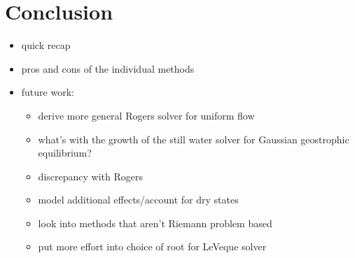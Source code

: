 \chapter{Conclusion}
\label{ch:conclusion}

\begin{itemize}
  \item quick recap
  \item pros and cons of the individual methods
  \item future work:
  \begin{itemize}
    \item derive more general Rogers solver for uniform flow
    \item what's with the growth of the still water solver for Gaussian geostrophic equilibrium?
    \item discrepancy with Rogers
    \item model additional effects/account for dry states
    \item look into methods that aren't Riemann problem based
    \item put more effort into choice of root for LeVeque solver
  \end{itemize}
\end{itemize}